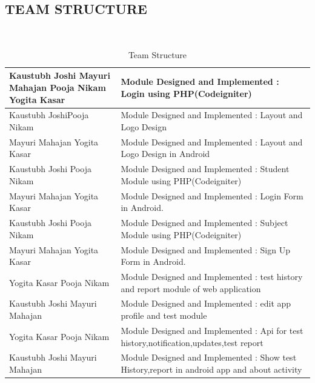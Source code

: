 \documentclass[oneside,a4paper,12pt]{report}
\begin{document}
\subsection{TEAM STRUCTURE}
\\
\hspace*{2.5in}
\begin{table}[h]
\centering
\begin{tabular}{|p{1.5in}|p{3.5in}|}
\hline	  
Kaustubh Joshi \newline Mayuri Mahajan \newline Pooja Nikam \newline Yogita Kasar}
& Module Designed and Implemented : Login using PHP(Codeigniter)
\\
\hline
Kaustubh Joshi\newline Pooja Nikam & Module Designed and Implemented : Layout and Logo Design
\\ 
\hline
Mayuri Mahajan \newline Yogita Kasar 
 & Module Designed and Implemented : Layout and Logo Design in Android
\\ 
\hline
Kaustubh Joshi \newline Pooja Nikam & Module Designed and Implemented : Student Module using PHP(Codeigniter) 
\\
\hline
Mayuri Mahajan \newline Yogita Kasar
 & Module Designed and Implemented : Login Form in Android. 
\\
\hline
Kaustubh Joshi \newline Pooja Nikam & Module Designed and Implemented : Subject Module using PHP(Codeigniter)
\\
\hline
Mayuri Mahajan \newline Yogita Kasar
 & Module Designed and Implemented : Sign Up Form in Android.
\\
\hline
Yogita Kasar \newline Pooja Nikam & Module Designed and Implemented : test history and report module of web application
\\
\hline	  
Kaustubh Joshi \newline Mayuri Mahajan 
& Module Designed and Implemented : edit app profile and test module
\\
\hline
Yogita Kasar \newline Pooja Nikam & Module Designed and Implemented : Api for test history,notification,updates,test report
\\
\hline	  
Kaustubh Joshi \newline Mayuri Mahajan 
& Module Designed and Implemented : Show test History,report in android app and about activity
\\
\hline

\end{tabular}
\caption{Team Structure}
\end{table}
\end{document}
